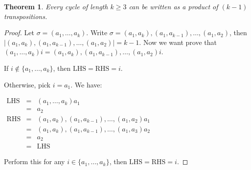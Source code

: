 \documentclass{article}
\theoremstyle{MyNonumberplain}
\theoremstyle{break}
\newtheorem*{proof}{Proof. }
\newcommand{\nin}{\not\in}
\newcommand{\tmop}{\text}
\theoremstyle{break}
\newtheorem{theorem}{Theorem}[section]
\theoremstyle{break}
\theoremstyle{definition}
\theoremstyle{break}
\begin{document}
\begin{thmbox}
    \begin{theorem}
        Every cycle of length $k\geq3$ can be written as a product of $(k-1)$ transpositions.
    \end{theorem}
    \begin{prfbox}
        \begin{proof}
            Let $\sigma = (a_1, \ldots, a_k)$. Write $\sigma = (a_1, a_k), (a_1,
            a_{k - 1}), \ldots, (a_1, a_2)$, then $| (a_1, a_k), (a_1, a_{k - 1}), \ldots, (a_1, a_2) | = k - 1$. Now we want prove that $(a_1, \ldots, a_k) i = (a_1, a_k), (a_1, a_{k - 1}), \ldots, (a_1, a_2) i$.\bigskip

            If $i \nin \{ a_1, \ldots, a_k \}$, then $\tmop{LHS} = \tmop{RHS} = i$.\bigskip

            Otherwise, pick $i=a_1$. We have:\bigskip

            \begin{center}
                $\begin{array}{lll}
                    \tmop{LHS} & = & (a_1, \ldots, a_k) a_1\\
                    & = & a_2\\
                    \tmop{RHS} & = & (a_1, a_k), (a_1, a_{k - 1}), \ldots, (a_1, a_2) a_1\\
                    & = & (a_1, a_k), (a_1, a_{k - 1}), \ldots, (a_1, a_3) a_2\\
                    & = & a_2\\
                    & = & \tmop{LHS}
                \end{array}$
            \end{center}
            Perform this for any $i \in \{ a_1, \ldots, a_k \}$, then $\tmop{LHS} = \tmop{RHS} = i$.
        \end{proof}
    \end{prfbox}
\end{thmbox}
\end{document}

